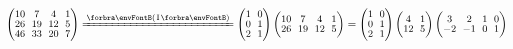 \BulletPointX\AExa ${\small\begin{pmatrix} 10 &\hspace{-4pt} 7 &\hspace{-4pt} 4 &\hspace{-4pt} 1 \\[-2pt] 26 &\hspace{-4pt} 19 &\hspace{-4pt} 12 &\hspace{-4pt} 5\\[-2pt] 46 &\hspace{-4pt} 33 &\hspace{-4pt} 20 &\hspace{-4pt} 7\end{pmatrix}}\xlongequal{\SmallPar{\text{I}}}{\small\begin{pmatrix} 1 &\hspace{-4pt} 0\\[-2pt] 0 &\hspace{-4pt} 1\\[-2pt] 2 &\hspace{-4pt} 1\end{pmatrix}\begin{pmatrix} 10 &\hspace{-4pt} 7 &\hspace{-4pt} 4 &\hspace{-4pt} 1\\[-2pt] 26 &\hspace{-4pt} 19 &\hspace{-4pt} 12 &\hspace{-4pt} 5\end{pmatrix}}={\small\begin{pmatrix} 1 &\hspace{-4pt} 0\\[-2pt] 0 &\hspace{-4pt} 1\\[-2pt] 2 &\hspace{-4pt} 1\end{pmatrix}\begin{pmatrix} 4 &\hspace{-4pt} 1\\[-2pt] 12 &\hspace{-4pt} 5\end{pmatrix}\begin{pmatrix} 3 &\hspace{-4pt} 2 &\hspace{-4pt} 1 &\hspace{-4pt} 0\\[-2pt] -2 &\hspace{-4pt} -1 &\hspace{-4pt} 0 &\hspace{-4pt} 1\end{pmatrix}}$\parExa{\IndentB}
